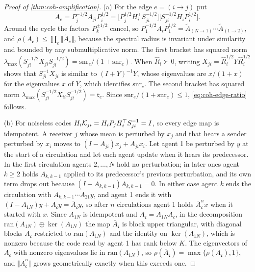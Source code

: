 \begin{proof}[Proof of \cref{thm:coh-amplification}]
(a) For the edge $e=(i\to j)$ put
\[ \tilde A_e=P_j^{-1/2}A_{ji}P_i^{1/2}=\bigl[P_j^{1/2}H_i^\top S_{ji}^{-1/2}\bigr]\bigl[S_{ji}^{-1/2}H_iP_i^{1/2}\bigr]. \]
Around the cycle the factors $P_k^{\pm1/2}$ cancel, so $P_1^{-1/2}A_{\mathfrak c}P_1^{1/2}=\tilde A_{(N\to1)}\cdots\tilde A_{(1\to2)}$, and $\rho(A_{\mathfrak c})\le\prod_e\Vert\tilde A_e\Vert$, because the spectral radius is invariant under similarity and bounded by any submultiplicative norm. The first bracket has squared norm $\lambda_{\max}(S_{ji}^{-1/2}X_{ji}S_{ji}^{-1/2})=\mathrm{snr}_e/(1+\mathrm{snr}_e)$. When $\hat R_i\succ0$, writing $X_{ji}=\hat R_i^{1/2}Y\hat R_i^{1/2}$ shows that $S_{ji}^{-1}X_{ji}$ is similar to $(I+Y)^{-1}Y$, whose eigenvalues are $x/(1+x)$ for the eigenvalues $x$ of $Y$, which identifies $\mathrm{snr}_e$. The second bracket has squared norm $\lambda_{\max}(S_{ji}^{-1/2}X_{ii}S_{ji}^{-1/2})=\mathfrak r_e$. Since $\mathrm{snr}_e/(1+\mathrm{snr}_e)\le1$, \eqref{eq:coh-edge-ratio} follows.

(b) For noiseless codes $H_i\mathcal{K}_{ji}=H_iP_jH_i^\top S_{ji}^{-1}=I$, so every edge map is idempotent. A receiver $j$ whose mean is perturbed by $x_j$ and that hears a sender perturbed by $x_i$ moves to $(I-A_{ji})x_j+A_{ji}x_i$. Let agent 1 be perturbed by $y$ at the start of a circulation and let each agent update when it hears its predecessor. In the first circulation agents $2,\dots,N$ hold no perturbation; in later ones agent $k\ge2$ holds $A_{k,k-1}$ applied to its predecessor's previous perturbation, and its own term drops out because $(I-A_{k,k-1})A_{k,k-1}=0$. In either case agent $k$ ends the circulation with $A_{k,k-1}\cdots A_{21}y$, and agent 1 ends it with $(I-A_{1N})y+A_{\mathfrak c}y=\bar A_{\mathfrak c}y$, so after $n$ circulations agent 1 holds $\bar A_{\mathfrak c}^nx$ when it started with $x$. Since $A_{1N}$ is idempotent and $A_{\mathfrak c}=A_{1N}A_{\mathfrak c}$, in the decomposition $\mathrm{ran}(A_{1N})\oplus\ker(A_{1N})$ the map $\bar A_{\mathfrak c}$ is block upper triangular, with diagonal blocks $A_{\mathfrak c}$ restricted to $\mathrm{ran}(A_{1N})$ and the identity on $\ker(A_{1N})$, which is nonzero because the code read by agent 1 has rank below $K$. The eigenvectors of $A_{\mathfrak c}$ with nonzero eigenvalues lie in $\mathrm{ran}(A_{1N})$, so $\rho(\bar A_{\mathfrak c})=\max\{\rho(A_{\mathfrak c}),1\}$, and $\Vert\bar A_{\mathfrak c}^n\Vert$ grows geometrically exactly when this exceeds one.
\end{proof}

